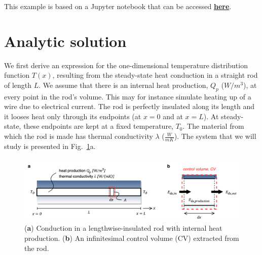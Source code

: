This example is based on a Jupyter notebook that can be accessed \href{https://mybinder.org/v2/gh/kamilazdybal/fluid-dynamics-and-transport-phenomena/master?filepath=transport-phenomena-with-Python%2Fcode%2F01-heat-conduction.ipynb}{\textbf{here}}.

\section{Analytic solution}

We first derive an expression for the one-dimensional temperature distribution function $T(x)$, resulting from the steady-state heat conduction in a straight rod of length $L$. We assume that there is an internal heat production, $Q_p$ ($W/m^3$), at every point in the rod's volume. This may for instance simulate heating up of a wire due to electrical current. The rod is perfectly insulated along its length and it looses heat only through its endpoints (at $x=0$ and at $x=L$). At steady-state, these endpoints are kept at a fixed temperature, $T_0$. The material from which the rod is made has thermal conductivity $\lambda$ ($\frac{W}{mK}$). The system that we will study is presented in Fig.~\ref{fig:heat-transfer-in-a-rod-theory}a.

\begin{figure}[H]
\centering\includegraphics[width=16cm]{figures/example-heat-transfer-in-a-rod-theory.png}
\caption{(\textbf{a}) Conduction in a lengthwise-insulated rod with internal heat production. (\textbf{b}) An infinitesimal control volume (CV) extracted from the rod.}
\label{fig:heat-transfer-in-a-rod-theory}
\end{figure}

